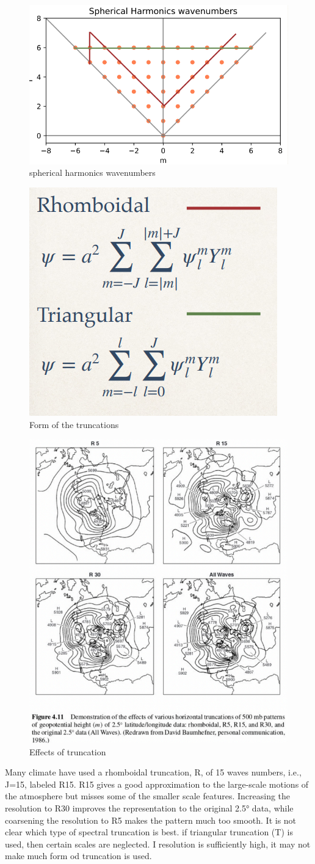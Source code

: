 \begin{figure}[h]
	\centering
	\includegraphics[width=0.5\linewidth]{uploads/Screenshot 2024-11-17 204935.png}
	\caption{spherical harmonics wavenumbers}
	\label{fig:The two most used truncation}
\end{figure}
\begin{figure}[h]
	\centering
	\includegraphics[width=0.35\linewidth]{uploads/Screenshot 2024-11-17 205109.png}
	\caption{Form of the truncations}
	\label{fig:enter-label}
\end{figure}
\begin{figure}[h]
	\centering
	\includegraphics[width=0.5\linewidth]{uploads/Screenshot 2024-11-17 205236.png}
	\caption{Effects of truncation}
	\label{fig:enter-label}
\end{figure}
Many climate have used a rhomboidal truncation, R, of 15 waves numbers, i.e., J=15, labeled R15. R15 gives a good approximation to the large-scale motions of the atmosphere but misses some of the smaller scale features. Increasing the resolution to R30 improves the representation to the original 2.5° data, while coarsening the resolution to R5 makes the pattern much too smooth. It is not clear which type of spectral truncation is best. if triangular truncation (T) is used, then certain scales are neglected. I resolution is sufficiently high, it may not make much form od truncation is used.
